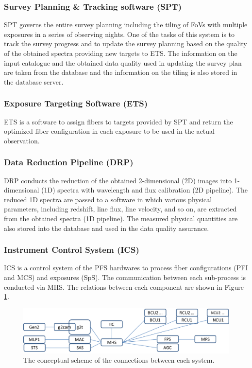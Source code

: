 \documentclass[a4paper]{article}
\begin{document}
\subsubsection{Survey Planning \& Tracking software (SPT)\label{sec:survey_operation:spt}}
SPT governs the entire survey planning including the tiling of FoVs with multiple exposures in a series of observing nights. One of the tasks of this system is to track the survey progress and to update the survey planning based on the quality of the obtained spectra providing new targets to ETS. The information on the input catalogue and the obtained data quality used in updating the survey plan are taken from the database and the information on the tiling is also stored in the database server.

\subsubsection{Exposure Targeting Software (ETS)\label{sec:survey_operation:ets}}
ETS is a software to assign fibers to targets provided by SPT and return the optimized fiber configuration in each exposure to be used in the actual observation. 

\subsubsection{Data Reduction Pipeline (DRP)\label{sec:survey_operation:drp}}
DRP conducts the reduction of the obtained 2-dimensional (2D) images into 1-dimensional (1D) spectra with wavelength and flux calibration (2D pipeline). The reduced 1D spectra are passed to a software in which various physical parameters, including redshift, line flux, line velocity, and so on, are extracted from the obtained spectra (1D pipeline). The measured physical quantities are also stored into the database and used in the data quality assurance.

\subsubsection{Instrument Control System (ICS)\label{sec:survey_operation:software}}
ICS is a control system of the PFS hardwares to process fiber configurations (PFI and MCS) and exposures (SpS). The communication between each sub-process is conducted via MHS. The relations between each component are shown in Figure \ref{fig:pfs_software_connections}. 

\begin{figure}[!htb]
\begin{center}
\includegraphics[scale=0.5]{./figures/software_connections.pdf}
\end{center}
\caption{The conceptual scheme of the connections between each system.\label{fig:pfs_software_connections}}
\end{figure}
\end{document}
